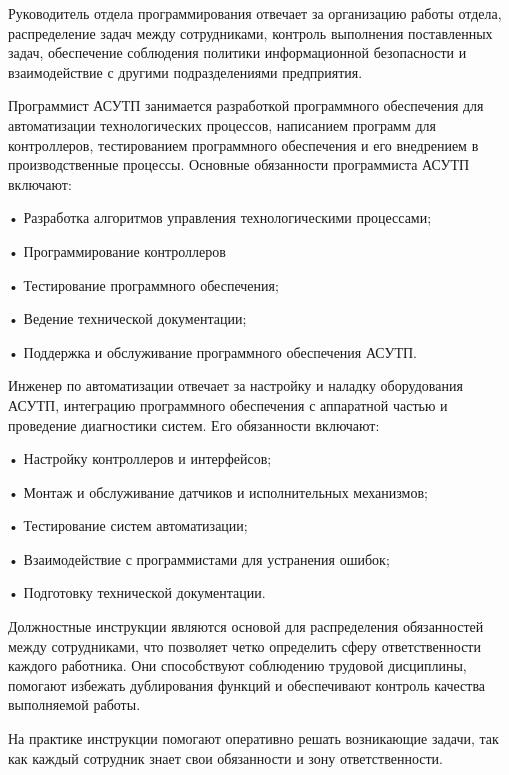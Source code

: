 {  \par \redline Руководитель отдела программирования отвечает за организацию работы отдела, распределение задач между сотрудниками, контроль выполнения поставленных задач, обеспечение соблюдения политики информационной безопасности и взаимодействие с другими подразделениями предприятия.

  \par \redline Программист АСУТП занимается разработкой программного обеспечения для автоматизации технологических процессов, написанием программ для контроллеров, тестированием программного обеспечения и его внедрением в производственные процессы. Основные обязанности программиста АСУТП включают:
  \par \redline • Разработка алгоритмов управления технологическими процессами;
  \par \redline • Программирование контроллеров
  \par \redline • Тестирование программного обеспечения;
  \par \redline • Ведение технической документации;
  \par \redline • Поддержка и обслуживание программного обеспечения АСУТП.

  \par \redline Инженер по автоматизации отвечает за настройку и наладку оборудования АСУТП, интеграцию программного обеспечения с аппаратной частью и проведение диагностики систем. Его обязанности включают:
  \par \redline • Настройку контроллеров и интерфейсов;
  \par \redline • Монтаж и обслуживание датчиков и исполнительных механизмов;
  \par \redline • Тестирование систем автоматизации;
  \par \redline • Взаимодействие с программистами для устранения ошибок;
  \par \redline • Подготовку технической документации.

  \par \redline Должностные инструкции являются основой для распределения обязанностей между сотрудниками, что позволяет четко определить сферу ответственности каждого работника. Они способствуют соблюдению трудовой дисциплины, помогают избежать дублирования функций и обеспечивают контроль качества выполняемой работы.

  \par \redline На практике инструкции помогают оперативно решать возникающие задачи, так как каждый сотрудник знает свои обязанности и зону ответственности. 

  \par 
}


